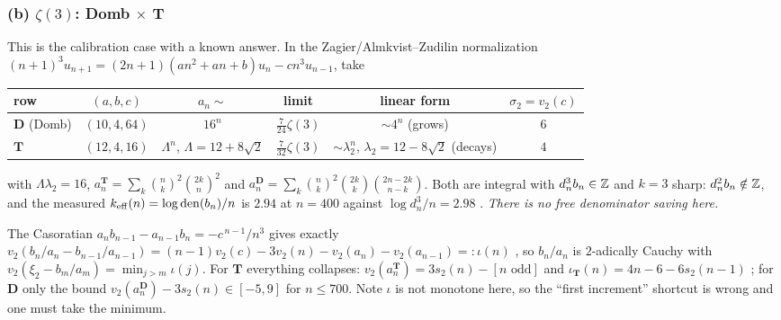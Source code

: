 \subsubsection*{(b) $\zeta(3)$: Domb $\times$ T}

This is the calibration case with a known answer.  In the
Zagier/Almkvist--Zudilin normalization
$(n+1)^3u_{n+1}=(2n+1)(an^2+an+b)u_n-cn^3u_{n-1}$, take

\begin{center}
\renewcommand{\arraystretch}{1.2}
\begin{tabular}{@{}l c c c c c@{}}
\toprule
row & $(a,b,c)$ & $a_n\sim$ & limit & linear form & $\sigma_2=v_2(c)$\\
\midrule
$\mathbf D$ (Domb) & $(10,4,64)$ & $16^n$ & $\tfrac7{24}\zeta(3)$ &
$\sim4^n$ (grows) & $6$\\
$\mathbf T$ & $(12,4,16)$ & $\Lambda^n$, $\Lambda=12+8\sqrt2$ &
$\tfrac7{32}\zeta(3)$ & $\sim\lambda_2^n$, $\lambda_2=12-8\sqrt2$ (decays) & $4$\\
\bottomrule
\end{tabular}
\end{center}

\noindent
with $\Lambda\lambda_2=16$, $a^{\mathbf T}_n=\sum_k\binom nk^2\binom{2k}n^2$
and $a^{\mathbf D}_n=\sum_k\binom nk^2\binom{2k}k\binom{2n-2k}{n-k}$.  Both are
integral with $d_n^3b_n\in\mathbb{Z}$ and $k=3$ sharp: $d_n^2b_n\notin\mathbb{Z}$, and the
measured $k_{\rm eff}(n)=\log\operatorname{den}(b_n)/n$ is $2.94$ at $n=400$
against $\log d_n^3/n=2.98$ .  \emph{There is no free
denominator saving here.}

The Casoratian $a_nb_{n-1}-a_{n-1}b_n=-c^{\,n-1}/n^3$ gives exactly
$v_2(b_n/a_n-b_{n-1}/a_{n-1})=(n-1)v_2(c)-3v_2(n)-v_2(a_n)-v_2(a_{n-1})
=:\iota(n)$ \Proved{}, so $b_n/a_n$ is $2$-adically Cauchy with
$v_2(\xi_2-b_m/a_m)=\min_{j>m}\iota(j)$.  For $\mathbf T$ everything collapses:
$v_2(a^{\mathbf T}_n)=3s_2(n)-[n\text{ odd}]$ and
$\iota_{\mathbf T}(n)=4n-6-6s_2(n-1)$ ; for $\mathbf D$ only the bound
$v_2(a^{\mathbf D}_n)-3s_2(n)\in[-5,9]$ for $n\le700$.  Note $\iota$ is not
monotone here, so the ``first increment'' shortcut is wrong and one must take
the minimum.

